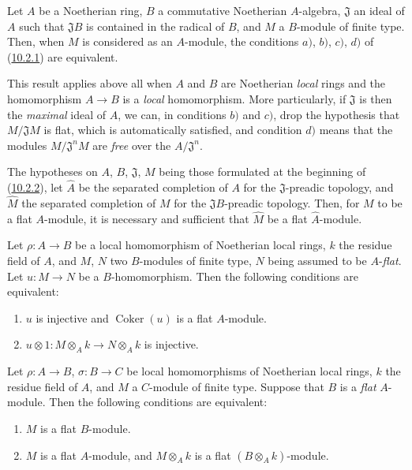 \begin{env}[10.2.2]
\label{0.10.2.2}
Let $A$ be a Noetherian ring, $B$ a commutative Noetherian $A$-algebra,
$\mathfrak{J}$ an ideal of $A$ such that $\mathfrak{J}B$ is contained in the
radical of $B$, and $M$ a $B$-module of finite type. Then, when $M$ is
considered as an $A$-module, the conditions $a)$, $b)$, $c)$, $d)$ of
(\hyperref[0.10.2.1]{10.2.1}) are equivalent.

This result applies above all when $A$ and $B$ are Noetherian
\emph{local} rings and the homomorphism $A\to B$ is a
\emph{local} homomorphism. More particularly, if $\mathfrak{J}$ is then the
\emph{maximal} ideal of $A$, we can, in conditions $b)$ and $c)$, drop
the hypothesis that $M/\mathfrak{J}M$ is flat, which is automatically satisfied,
and condition $d)$ means that the modules $M/\mathfrak{J}^nM$ are
\emph{free} over the $A/\mathfrak{J}^n$.
\end{env}

\begin{env}[10.2.3]
\label{0.10.2.3}
The hypotheses on $A$, $B$, $\mathfrak{J}$, $M$ being those formulated at the
beginning of (\hyperref[0.10.2.2]{10.2.2}), let $\widehat A$ be the separated
completion of $A$ for the $\mathfrak{J}$-preadic topology, and $\widehat M$ the
separated completion of $M$ for the $\mathfrak{J}B$-preadic topology. Then,
for $M$ to be a flat $A$-module, it is necessary and sufficient that $\widehat M$
be a flat $\widehat A$-module.
\end{env}

\begin{env}[10.2.4]
\label{0.10.2.4}
Let $\rho:A\to B$ be a local homomorphism of Noetherian local rings, $k$
the residue field of $A$, and $M$, $N$ two $B$-modules of finite type, $N$ being
assumed to be $A$-\emph{flat}. Let $u:M\to N$ be a $B$-homomorphism. Then the
following conditions are equivalent:
\begin{enumerate}
  \item[$a)$] $u$ is injective and $\operatorname{Coker}(u)$ is a flat $A$-module.
  \item[$b)$] $u\otimes1:M\otimes_A k\to N\otimes_A k$ is injective.
\end{enumerate}
\end{env}

\begin{env}[10.2.5]
\label{0.10.2.5}
Let $\rho:A\to B$, $\sigma:B\to C$ be local homomorphisms of Noetherian
local rings, $k$ the residue field of $A$, and $M$ a $C$-module of finite
type. Suppose that $B$ is a \emph{flat} $A$-module. Then the following
conditions are equivalent:
\begin{enumerate}
  \item[$a)$] $M$ is a flat $B$-module.
  \item[$b)$] $M$ is a flat $A$-module, and $M\otimes_A k$ is a flat
    $(B\otimes_A k)$-module.
\end{enumerate}
\end{env}

